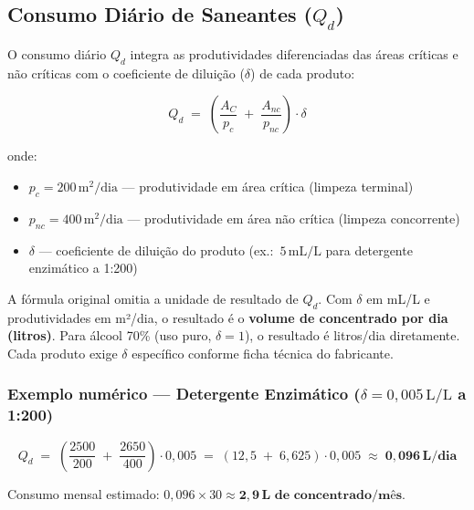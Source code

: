 \documentclass[12pt,a4paper]{article}
\begin{document}
\subsection{Consumo Diário de Saneantes (\texorpdfstring{$Q_d$}{Qd})}

O consumo diário $Q_d$ integra as produtividades diferenciadas das áreas críticas e não críticas com o coeficiente de diluição ($\delta$) de cada produto:

\begin{formulabox}
\[
  Q_d \;=\; \left(\frac{A_C}{p_c} \;+\; \frac{A_{nc}}{p_{nc}}\right) \cdot \delta
\]
\end{formulabox}

\noindent onde:
\begin{itemize}
  \item $p_c = 200\,\text{m}^2/\text{dia}$ --- produtividade em área crítica (limpeza terminal)
  \item $p_{nc} = 400\,\text{m}^2/\text{dia}$ --- produtividade em área não crítica (limpeza concorrente)
  \item $\delta$ --- coeficiente de diluição do produto (ex.:~$5\,\text{mL/L}$ para detergente enzimático a 1:200)
\end{itemize}

\begin{alertbox}
A fórmula original omitia a unidade de resultado de $Q_d$. Com $\delta$ em mL/L e produtividades em m²/dia, o resultado é o \textbf{volume de concentrado por dia (litros)}. Para álcool 70\% (uso puro, $\delta = 1$), o resultado é litros/dia diretamente. Cada produto exige $\delta$ específico conforme ficha técnica do fabricante.
\end{alertbox}

\subsubsection*{Exemplo numérico --- Detergente Enzimático ($\delta = 0{,}005\,\text{L/L}$ a 1:200)}

\begin{formulabox}
\[
  Q_d \;=\; \left(\frac{2500}{200} \;+\; \frac{2650}{400}\right) \cdot 0{,}005
  \;=\; \left(12{,}5 \;+\; 6{,}625\right) \cdot 0{,}005
  \;\approx\; \mathbf{0{,}096\,\text{L}/\text{dia}}
\]
\end{formulabox}

\noindent Consumo mensal estimado: $0{,}096 \times 30 \approx \mathbf{2{,}9\,\text{L de concentrado/mês}}$.
\end{document}
